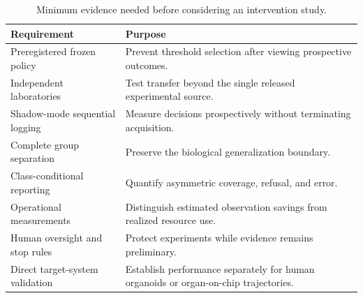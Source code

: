 \documentclass[11pt,twocolumn]{article}
\begin{document}
\begin{table}[H]
\centering
\caption{Minimum evidence needed before considering an intervention study.}
\label{tab:prospective}
\normalsize
\begin{tabularx}{0.96\textwidth}{@{}>{\raggedright\arraybackslash}p{}>{\raggedright\arraybackslash}X@{}}
\toprule
Requirement & Purpose \\
\midrule
Preregistered frozen policy & Prevent threshold selection after viewing prospective outcomes. \\
Independent laboratories & Test transfer beyond the single released experimental source. \\
Shadow-mode sequential logging & Measure decisions prospectively without terminating acquisition. \\
Complete group separation & Preserve the biological generalization boundary. \\
Class-conditional reporting & Quantify asymmetric coverage, refusal, and error. \\
Operational measurements & Distinguish estimated observation savings from realized resource use. \\
Human oversight and stop rules & Protect experiments while evidence remains preliminary. \\
Direct target-system validation & Establish performance separately for human organoids or
organ-on-chip trajectories. \\
\bottomrule
\end{tabularx}
\end{table}
\end{document}
